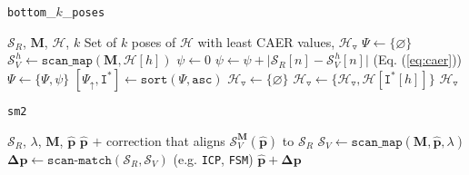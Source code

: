 \begin{algorithm}[]
  \caption{\texttt{bottom}\_$k$\_\texttt{poses}}
  \begin{spacing}{1.0}
  \begin{algorithmic}[1]
    \REQUIRE $\mathcal{S}_R$, $\bm{M}$, $\mathcal{H}$, $k$
    \ENSURE Set of $k$ poses of $\mathcal{H}$ with least CAER values, $\mathcal{H}_{\triangledown}$
    \STATE $\Psi \leftarrow \{\varnothing \}$
      \STATE $\mathcal{S}_V^{\hspace{1pt} h} \leftarrow \texttt{scan\_map}(\bm{M}, \mathcal{H}[h])$
      \STATE $\psi \leftarrow 0$
        \STATE $\psi \leftarrow \psi + \big|\mathcal{S}_R[n]-\mathcal{S}_V^{\hspace{1pt} h}[n]\big|$ \hfill {\small (Eq. (\ref{eq:caer})})
      \ENDFOR
      \STATE $\Psi \leftarrow \{\Psi, \psi\}$
    \ENDFOR
    \STATE $[\Psi_{\uparrow}, \texttt{I}^{\ast}] \leftarrow \texttt{sort}(\Psi, \texttt{asc})$
    \STATE $\mathcal{H}_{\triangledown} \leftarrow \{\varnothing \}$
      \STATE $\mathcal{H}_{\triangledown} \leftarrow \{\mathcal{H}_{\triangledown}, \mathcal{H}[\texttt{I}^{\ast}[h]]\}$
    \ENDFOR
    \RETURN $\mathcal{H}_{\triangledown}$
  \end{algorithmic}
  \end{spacing}
  \label{alg:bottom_k}
\end{algorithm}

\begin{algorithm}[]
  \caption{\texttt{sm2}}
  \begin{spacing}{1.0}
  \begin{algorithmic}[1]
    \REQUIRE $\mathcal{S}_R$, $\lambda$, $\bm{M}$, $\hat{\bm{p}}$
    \ENSURE $\hat{\bm{p}}$ $+$ correction that aligns $\mathcal{S}_V^{\bm{M}}(\hat{\bm{p}})$ to $\mathcal{S}_R$
    \STATE $\mathcal{S}_V \leftarrow \texttt{scan\_map}(\bm{M}, \hat{\bm{p}}, \lambda)$
    \STATE $\bm{\Delta p} \leftarrow \texttt{scan-match}(\mathcal{S}_R,\mathcal{S}_V)$ \hfill {\small (e.g. \texttt{ICP}\cite{Vizzo2023}, \texttt{FSM}\cite{Filotheou2022f}})
    \RETURN $\hat{\bm{p}} + \bm{\Delta p}$
  \end{algorithmic}
  \end{spacing}
  \label{alg:sm2}
\end{algorithm}
